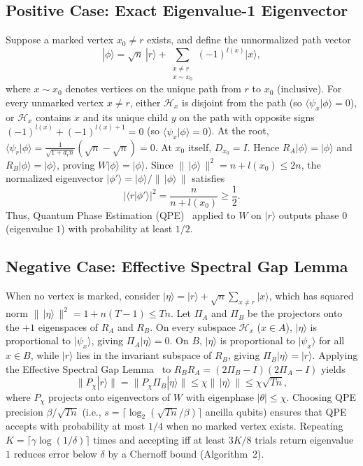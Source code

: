 \documentclass[11pt,a4paper]{article}
\begin{document}
\subsection{Positive Case: Exact Eigenvalue-1 Eigenvector}
Suppose a marked vertex $x_0 \neq r$ exists, and define the unnormalized path vector
\begin{equation}
|\phi\rangle = \sqrt{n}\,|r\rangle + \sum_{\substack{x \neq r \\ x \sim x_0}} (-1)^{l(x)} |x\rangle,
\label{eq:eigenvector}
\end{equation}
where $x \sim x_0$ denotes vertices on the unique path from $r$ to $x_0$ (inclusive). For every unmarked vertex $x \neq r$, either $\mathcal{H}_x$ is disjoint from the path (so $\langle \psi_x | \phi \rangle = 0$), or $\mathcal{H}_x$ contains $x$ and its unique child $y$ on the path with opposite signs $(-1)^{l(x)} + (-1)^{l(x)+1} = 0$ (so $\langle \psi_x | \phi \rangle = 0$). At the root, $\langle \psi_r | \phi \rangle = \frac{1}{\sqrt{1+d_r n}}(\sqrt{n} - \sqrt{n}) = 0$. At $x_0$ itself, $D_{x_0} = I$. Hence $R_A |\phi\rangle = |\phi\rangle$ and $R_B |\phi\rangle = |\phi\rangle$, proving $W |\phi\rangle = |\phi\rangle$. Since $\|\,|\phi\rangle\,\|^2 = n + l(x_0) \le 2n$, the normalized eigenvector $|\phi'\rangle = |\phi\rangle / \|\,|\phi\rangle\,\|$ satisfies
\[
\bigl|\langle r | \phi' \rangle\bigr|^2 = \frac{n}{n + l(x_0)} \ge \frac{1}{2}.
\]
Thus, Quantum Phase Estimation (QPE)~\cite{cleve1998} applied to $W$ on $|r\rangle$ outputs phase $0$ (eigenvalue $1$) with probability at least $1/2$.

\subsection{Negative Case: Effective Spectral Gap Lemma}
When no vertex is marked, consider $|\eta\rangle = |r\rangle + \sqrt{n}\sum_{x \neq r} |x\rangle$, which has squared norm $\|\,|\eta\rangle\,\|^2 = 1 + n(T - 1) \le Tn$. Let $\Pi_A$ and $\Pi_B$ be the projectors onto the $+1$ eigenspaces of $R_A$ and $R_B$. On every subspace $\mathcal{H}_x$ ($x \in A$), $|\eta\rangle$ is proportional to $|\psi_x\rangle$, giving $\Pi_A |\eta\rangle = 0$. On $B$, $|\eta\rangle$ is proportional to $|\psi_x\rangle$ for all $x \in B$, while $|r\rangle$ lies in the invariant subspace of $R_B$, giving $\Pi_B |\eta\rangle = |r\rangle$. Applying the Effective Spectral Gap Lemma~\cite{lee2011} to $R_B R_A = (2\Pi_B - I)(2\Pi_A - I)$ yields
\[
\| P_\chi |r\rangle \| = \| P_\chi \Pi_B |\eta\rangle \| \le \chi \|\,|\eta\rangle\,\| \le \chi \sqrt{Tn},
\]
where $P_\chi$ projects onto eigenvectors of $W$ with eigenphase $|\theta| \le \chi$. Choosing QPE precision $\beta / \sqrt{Tn}$ (i.e., $s = \lceil \log_2(\sqrt{Tn}/\beta) \rceil$ ancilla qubits) ensures that QPE accepts with probability at most $1/4$ when no marked vertex exists. Repeating $K = \lceil \gamma \log(1/\delta) \rceil$ times and accepting iff at least $3K/8$ trials return eigenvalue $1$ reduces error below $\delta$ by a Chernoff bound (Algorithm~2).
\end{document}
